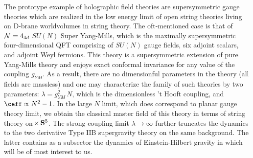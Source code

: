 \documentclass[12pt,openany]{book}
\begin{document}
 The prototype example of holographic field theories are supersymmetric gauge theories which are realized in the  low energy  limit of open string theories living on D-brane worldvolumes in string theory. The oft-mentioned case is that of
 ${\cal N}=4_{4d}$ $SU(N)$ Super  Yang-Mills, which is the maximally supersymmetric four-dimensional QFT comprising of $SU(N)$ gauge fields, six adjoint scalars, and adjoint Weyl fermions. This theory is a supersymmetric extension of pure Yang-Mills theory and enjoys exact conformal invariance for any value of the coupling $g_{YM}$. As a result, there are no dimensionful parameters in the theory (all fields are massless) and one may characterize the family of such theories by two parameters: $\lambda = g_{YM}^2\, N$, which is the dimensionless  't Hooft coupling, and $\ceff \propto N^2 -1$. In the large $N$ limit, which does correspond to planar gauge theory limit, we obtain the classical master field of this theory in terms of string theory on
  $\!\times \,{\bf S}^5$. The strong coupling limit $\lambda \to \infty$ further truncates the dynamics to the two derivative Type IIB supergravity theory on the same background. The latter contains as a subsector the dynamics of Einstein-Hilbert gravity in  which will be of most interest to us.
\end{document}
